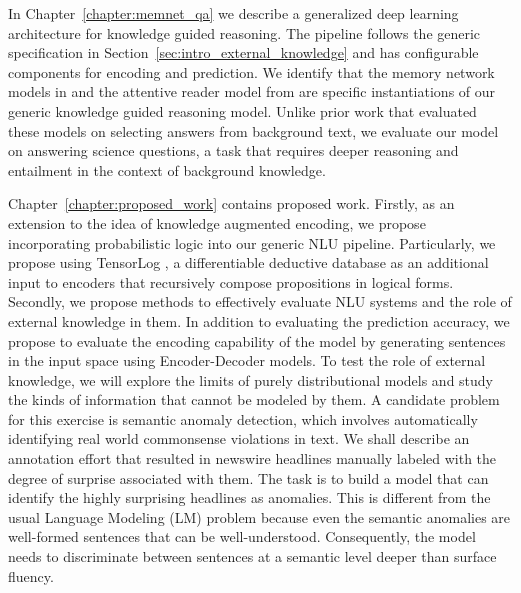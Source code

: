 In Chapter~\ref{chapter:memnet_qa} we describe a generalized deep learning architecture for knowledge guided reasoning.
The pipeline follows the generic specification in Section~\ref{sec:intro_external_knowledge} and has configurable components
for encoding and prediction. We identify that the memory network models in \cite{weston2014memory,Sukhbaatar2015EndToEndMN,Xiong2016DynamicMN}
and the attentive reader model from \cite{hermann2015teaching} are specific instantiations of our generic knowledge guided reasoning model.
Unlike prior work that evaluated these models on selecting answers from background text, we evaluate our model on answering science questions, 
a task that requires deeper reasoning and entailment in the context of background knowledge.

Chapter~\ref{chapter:proposed_work} contains proposed work. Firstly, as an extension to the idea of knowledge augmented encoding, 
we propose incorporating probabilistic logic into our generic NLU pipeline. Particularly, we propose using TensorLog \cite{cohen2016tensorlog},
a differentiable deductive database as an additional input to encoders that recursively compose propositions in logical forms. Secondly, we propose methods to effectively evaluate NLU systems
and the role of external knowledge in them. In addition to evaluating the prediction accuracy, we propose to evaluate the encoding capability of the model by 
generating sentences in the input space using Encoder-Decoder models. To test the role of external knowledge, we will explore the limits of purely distributional models
and study the kinds of information that cannot be modeled by them. A candidate problem for this
exercise is semantic anomaly detection, which involves automatically 
identifying real world commonsense violations in text. We shall describe an annotation
effort that resulted in newswire headlines manually labeled with the degree
of surprise associated with them. The task is to build a model that can identify the highly
surprising headlines as anomalies. This is different from the usual Language Modeling (LM) problem
because even the semantic anomalies are well-formed sentences that can be well-understood. Consequently,
the model needs to discriminate between sentences at a semantic level deeper than surface fluency.